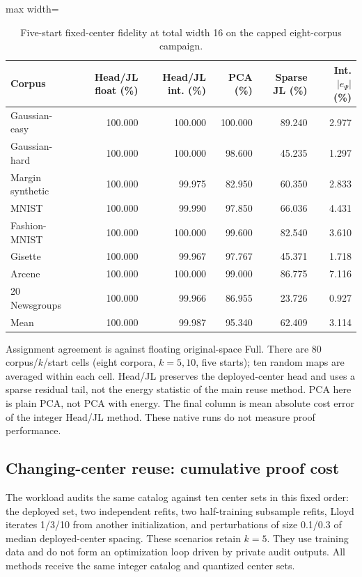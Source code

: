 \documentclass[5p,times,twocolumn]{elsarticle}
\theoremstyle{plain}
\theoremstyle{definition}
\theoremstyle{remark}
\begin{document}
\par\endgroup
\begingroup\color{RevisionGreen}
\begin{table}[tp]\color{RevisionGreen}
\caption{Five-start fixed-center fidelity at total width 16 on the capped eight-corpus campaign.}\label{tab:fixed-five-starts}
\centering\small
\begin{adjustbox}{max width=\textwidth}
\begin{tabular}{@{}lrrrrr@{}}
\toprule
Corpus & Head/JL float (\%) & Head/JL int. (\%) & PCA (\%) & Sparse JL (\%) & Int. $|e_\Psi|$ (\%) \\
\midrule
Gaussian-easy & 100.000 & 100.000 & 100.000 & 89.240 & 2.977 \\
Gaussian-hard & 100.000 & 100.000 & 98.600 & 45.235 & 1.297 \\
Margin synthetic & 100.000 & 99.975 & 82.950 & 60.350 & 2.833 \\
MNIST & 100.000 & 99.990 & 97.850 & 66.036 & 4.431 \\
Fashion-MNIST & 100.000 & 100.000 & 99.600 & 82.540 & 3.610 \\
Gisette & 100.000 & 99.967 & 97.767 & 45.371 & 1.718 \\
Arcene & 100.000 & 100.000 & 99.000 & 86.775 & 7.116 \\
20 Newsgroups & 100.000 & 99.966 & 86.955 & 23.726 & 0.927 \\
Mean & 100.000 & 99.987 & 95.340 & 62.409 & 3.114 \\
\bottomrule
\end{tabular}
\end{adjustbox}
\par\smallskip\begin{minipage}{0.98\textwidth}\footnotesize Assignment agreement is against floating original-space Full. There are 80 corpus/$k$/start cells (eight corpora, $k=5,10$, five starts); ten random maps are averaged within each cell. Head/JL preserves the deployed-center head and uses a sparse residual tail, not the energy statistic of the main reuse method. PCA here is plain PCA, not PCA with energy. The final column is mean absolute cost error of the integer Head/JL method. These native runs do not measure proof performance.\end{minipage}
\end{table}


\par\endgroup


\subsection{\textcolor{RevisionGreen}{Changing-center reuse: cumulative proof cost}}
\begingroup\color{RevisionGreen}
The workload audits the same catalog against ten center sets in this fixed order: the deployed set, two independent refits, two half-training subsample refits, Lloyd iterates 1/3/10 from another initialization, and perturbations of size 0.1/0.3 of median deployed-center spacing. These scenarios retain $k=5$. They use training data and do not form an optimization loop driven by private audit outputs. All methods receive the same integer catalog and quantized center sets.
\end{document}
